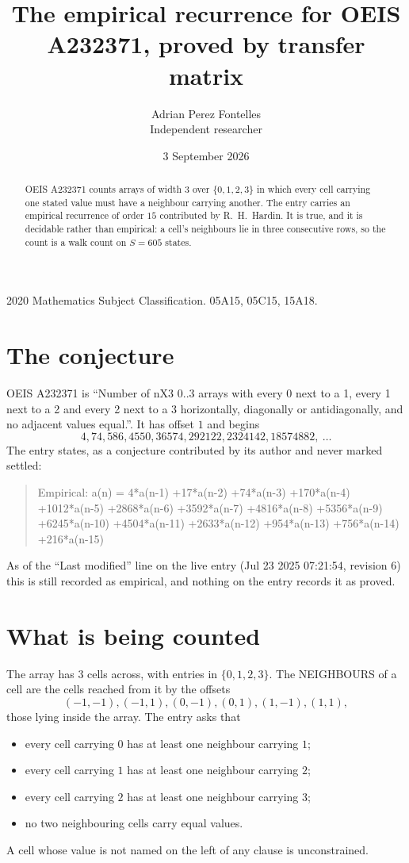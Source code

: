 \documentclass[11pt,a4paper]{article}
\title{The empirical recurrence for OEIS A232371, proved by transfer matrix}
\author{Adrian Perez Fontelles\\ \small Independent researcher}
\date{3 September 2026}
\theoremstyle{plain}
\theoremstyle{definition}
\begin{document}
\maketitle

\begin{abstract}
OEIS A232371 counts arrays of width $3$ over $\{0,1,2,3\}$ in which every cell carrying one stated
value must have a neighbour carrying another. The entry carries an empirical recurrence of
order $15$ contributed by R.~H.~Hardin. It is true, and it is decidable rather than
empirical: a cell's neighbours lie in three consecutive rows, so the count is a walk count on
$S=605$ states.
\end{abstract}

\noindent\small 2020 Mathematics Subject Classification. 05A15, 05C15, 15A18.\normalsize

\section{The conjecture}

OEIS A232371 is ``Number of nX3 0..3 arrays with every 0 next to a 1, every 1 next to a 2 and every 2 next to a 3 horizontally, diagonally or antidiagonally, and no adjacent values equal.''. It has offset $1$ and begins
\[
4, 74, 586, 4550, 36574, 292122, 2324142, 18574882,\ \dots
\]
The entry states, as a conjecture contributed by its author and never marked settled:
\begin{quote}
Empirical: a(n) = 4*a(n-1) +17*a(n-2) +74*a(n-3) +170*a(n-4) +1012*a(n-5) +2868*a(n-6) +3592*a(n-7) +4816*a(n-8) +5356*a(n-9) +6245*a(n-10) +4504*a(n-11) +2633*a(n-12) +954*a(n-13) +756*a(n-14) +216*a(n-15)
\end{quote}
As of the ``Last modified'' line on the live entry (Jul 23 2025 07:21:54, revision 6) this is still
recorded as empirical, and nothing on the entry records it as proved.

\section{What is being counted}

The array has $3$ cells across, with entries in $\{0,1,2,3\}$. The NEIGHBOURS of a cell are the
cells reached from it by the offsets
\[
(-1,-1), (-1,1), (0,-1), (0,1), (1,-1), (1,1),
\]
those lying inside the array. The entry asks that
\begin{itemize}
\item every cell carrying $0$ has at least one neighbour carrying $1$;
\item every cell carrying $1$ has at least one neighbour carrying $2$;
\item every cell carrying $2$ has at least one neighbour carrying $3$;
\item no two neighbouring cells carry equal values.
\end{itemize}
A cell whose value is not named on the left of any clause is unconstrained.
\end{document}
